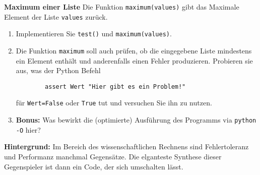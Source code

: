 \textbf{Maximum einer Liste}
Die Funktion \verb|maximum(values)| gibt das Maximale Element der Liste \verb|values| zurück.
\begin{enumerate}
	\item Implementieren Sie \verb|test()| und \verb|maximum(values)|. 
	\item Die Funktion \verb|maximum| soll auch prüfen, ob die eingegebene Liste mindestens ein Element enthält und anderenfalls einen Fehler produzieren.
	Probieren sie aus, was der Python Befehl
	\begin{lstlisting}
		assert Wert "Hier gibt es ein Problem!"\end{lstlisting}
	für \verb|Wert=False| oder \verb|True| tut und versuchen Sie ihn zu nutzen.
	\item \textbf{Bonus: } Was bewirkt die (optimierte) Ausführung des Programms via \verb|python -O| hier?
\end{enumerate}
\textbf{Hintergrund: } Im Bereich des wissenschaftlichen Rechnens sind Fehlertoleranz und Performanz manchmal Gegensätze. Die elganteste Synthese dieser Gegenspieler ist dann ein Code, der sich umschalten lässt. \\
